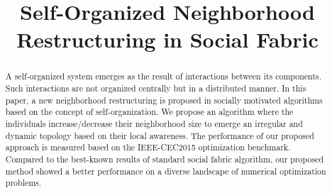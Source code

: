 \documentclass{llncs}
\begin{document}
%
\title{Self-Organized Neighborhood Restructuring in Social Fabric}
\maketitle
\begin{abstract}
A self-organized system emerges as the result of interactions between its components. Such interactions are not organized centrally but in a distributed manner. In this paper, a new neighborhood restructuring is proposed in socially motivated algorithms based on the concept of self-organization. We propose an algorithm where the individuals increase/decrease their neighborhood size to emerge an irregular and dynamic topology based on their local awareness. The performance of our proposed approach is measured based on the IEEE-CEC2015 optimization benchmark. Compared to the best-known results of standard social fabric algorithm, our proposed method showed a better performance on a diverse landscape of numerical optimization problems.
\end{abstract}
\end{document}
